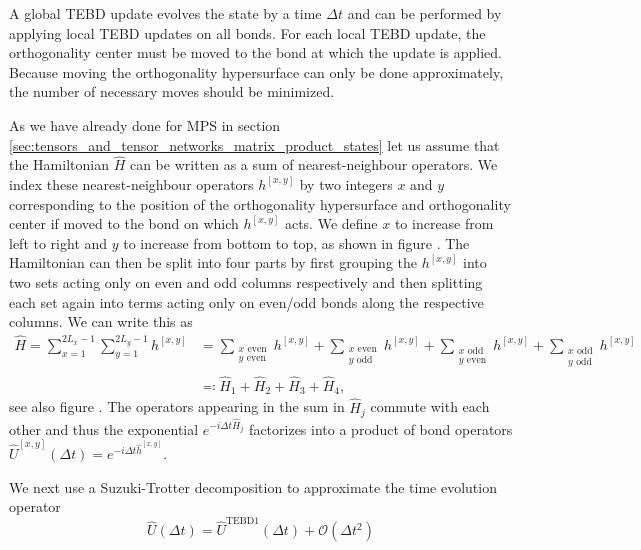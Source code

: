 A global TEBD update evolves the state by a time $\Delta t$ and can be performed by applying local TEBD updates on all bonds. For each local TEBD update, the orthogonality center must be moved to the bond at which the update is applied. Because moving the orthogonality hypersurface can only be done approximately, the number of necessary moves should be minimized. \par
As we have already done for MPS in section \ref{sec:tensors_and_tensor_networks_matrix_product_states} let us assume that the Hamiltonian $\hat{H}$ can be written as a sum of nearest-neighbour operators. We index these nearest-neighbour operators $h^{[x, y]}$ by two integers $x$ and $y$ corresponding to the position of the orthogonality hypersurface and orthogonality center if moved to the bond on which $h^{[x,y]}$ acts. We define $x$ to increase from left to right and $y$ to increase from bottom to top, as shown in figure . The Hamiltonian can then be split into four parts by first grouping the $h^{[x,y]}$ into two sets acting only on even and odd columns respectively and then splitting each set again into terms acting only on even/odd bonds along the respective columns. We can write this as
\begin{equation}
	\label{eq:disoTPS_TEBD_splitting_local_Hamiltonian}
	\begin{split}
		\hat{H} = \sum_{x=1}^{2L_x-1} \sum_{y=1}^{2L_y-1}h^{[x,y]} &= \sum_{\substack{x\text{ even}\\y\text{ even}}} h^{[x, y]} + \sum_{\substack{x\text{ even}\\y\text{ odd}}} h^{[x, y]} + \sum_{\substack{x\text{ odd}\\y\text{ even}}} h^{[x, y]} + \sum_{\substack{x\text{ odd}\\y\text{ odd}}} h^{[x, y]} \\
		&\eqqcolon \hat{H}_1 + \hat{H}_2 + \hat{H}_3 + \hat{H}_4,
	\end{split}
\end{equation}
see also figure . The operators appearing in the sum in $\hat{H}_j$ commute with each other and thus the exponential $e^{-i\Delta t\hat{H}_j}$ factorizes into a product of bond operators $\hat{U}^{[x, y]}(\Delta t) = e^{-i\Delta t\hat{h}^{[x, y]}}$. \par
We next use a Suzuki-Trotter decomposition to approximate the time evolution operator
\begin{equation}
	\label{eq:disoTPS_TEBD_suzuki_trotter_first_order}
	\hat{U}(\Delta t) = \hat{U}^\text{TEBD1}(\Delta t) + \mathcal{O}(\Delta t^2)
\end{equation}
